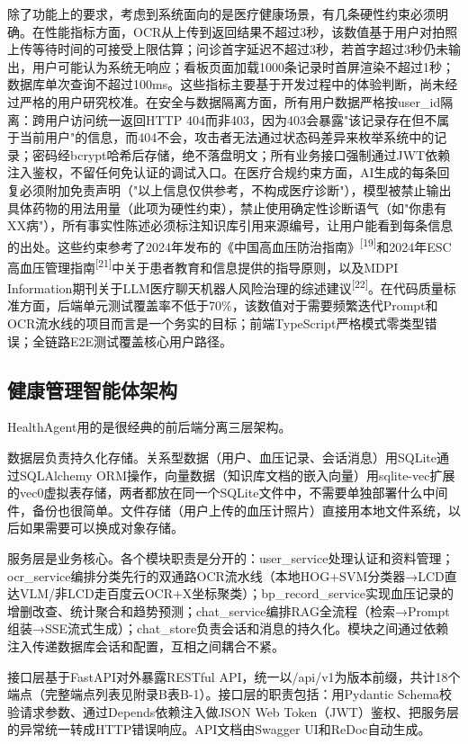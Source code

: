 \documentclass[zihao=-4,a4paper]{ctexart}
\numberwithin{figure}{section}
\numberwithin{table}{section}
\begin{document}
除了功能上的要求，考虑到系统面向的是医疗健康场景，有几条硬性约束必须明确。在性能指标方面，OCR从上传到返回结果不超过3秒，该数值基于用户对拍照上传等待时间的可接受上限估算；问诊首字延迟不超过3秒，若首字超过3秒仍未输出，用户可能认为系统无响应；看板页面加载1000条记录时首屏渲染不超过1秒；数据库单次查询不超过100ms。这些指标主要基于开发过程中的体验判断，尚未经过严格的用户研究校准。在安全与数据隔离方面，所有用户数据严格按user\_id隔离：跨用户访问统一返回HTTP 404而非403，因为403会暴露"该记录存在但不属于当前用户"的信息，而404不会，攻击者无法通过状态码差异来枚举系统中的记录；密码经bcrypt哈希后存储，绝不落盘明文；所有业务接口强制通过JWT依赖注入鉴权，不留任何免认证的调试入口。在医疗合规约束方面，AI生成的每条回复必须附加免责声明（"以上信息仅供参考，不构成医疗诊断"），模型被禁止输出具体药物的用法用量（此项为硬性约束），禁止使用确定性诊断语气（如"你患有XX病"），所有事实性陈述必须标注知识库引用来源编号，让用户能看到每条信息的出处。这些约束参考了2024年发布的《中国高血压防治指南》\textsuperscript{[19]}和2024年ESC高血压管理指南\textsuperscript{[21]}中关于患者教育和信息提供的指导原则，以及MDPI Information期刊关于LLM医疗聊天机器人风险治理的综述建议\textsuperscript{[22]}。在代码质量标准方面，后端单元测试覆盖率不低于70\%，该数值对于需要频繁迭代Prompt和OCR流水线的项目而言是一个务实的目标；前端TypeScript严格模式零类型错误；全链路E2E测试覆盖核心用户路径。

\subsection{健康管理智能体架构}

HealthAgent用的是很经典的前后端分离三层架构。

数据层负责持久化存储。关系型数据（用户、血压记录、会话消息）用SQLite通过SQLAlchemy ORM操作，向量数据（知识库文档的嵌入向量）用sqlite-vec扩展的vec0虚拟表存储，两者都放在同一个SQLite文件中，不需要单独部署什么中间件，备份也很简单。文件存储（用户上传的血压计照片）直接用本地文件系统，以后如果需要可以换成对象存储。

服务层是业务核心。各个模块职责是分开的：user\_service处理认证和资料管理；ocr\_service编排分类先行的双通路OCR流水线（本地HOG+SVM分类器→LCD直达VLM/非LCD走百度云OCR+X坐标聚类）；bp\_record\_service实现血压记录的增删改查、统计聚合和趋势预测；chat\_service编排RAG全流程（检索→Prompt组装→SSE流式生成）；chat\_store负责会话和消息的持久化。模块之间通过依赖注入传递数据库会话和配置，互相之间耦合不紧。

接口层基于FastAPI对外暴露RESTful API，统一以/api/v1为版本前缀，共计18个端点（完整端点列表见附录B表B-1）。接口层的职责包括：用Pydantic Schema校验请求参数、通过Depends依赖注入做JSON Web Token（JWT）鉴权、把服务层的异常统一转成HTTP错误响应。API文档由Swagger UI和ReDoc自动生成。
\end{document}
